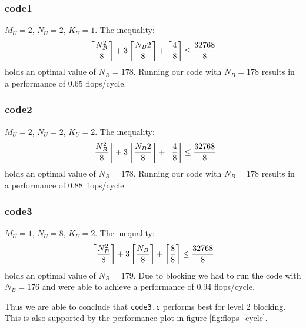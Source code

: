 \documentclass[portrait,a4paper]{article}
\begin{document}
\subsubsection{code1}
$M_U=2$, $N_U=2$, $K_U=1$. The inequality:
\begin{align*}
    \left\lceil {N_B^2 \over 8} \right\rceil + 3\left\lceil {N_B 2 \over 8} \right\rceil
    + \left\lceil {4 \over 8} \right\rceil \leq {32768 \over 8}
\end{align*}
holds an optimal value of $N_B=178$.  Running our code with $N_B=178$ results in a performance of $0.65$ flops/cycle.
\subsubsection{code2}
$M_U=2$, $N_U=2$, $K_U=2$. The inequality:
\begin{align*}
    \left\lceil {N_B^2 \over 8} \right\rceil + 3\left\lceil {N_B 2 \over 8} \right\rceil
    + \left\lceil {4\over 8} \right\rceil \leq {32768 \over 8}
\end{align*}
holds an optimal value of $N_B=178$. Running our code with $N_B=178$ results in a performance of $0.88$ flops/cycle.

\subsubsection{code3}
$M_U=1$, $N_U=8$, $K_U=2$. The inequality:
\begin{align*}
    \left\lceil {N_B^2 \over 8} \right\rceil + 3\left\lceil {N_B \over 8} \right\rceil
    + \left\lceil {8 \over 8} \right\rceil \leq {32768 \over 8}
\end{align*}
holds an optimal value of $N_B=179$. Due to blocking we had to run the code with $N_B=176$ and were able to achieve a performance of $0.94$ flops/cycle.

Thus we are able to conclude that \lstinline{code3.c} performs best for level 2 blocking. This is also supported by the performance plot in figure \ref{fig:flops_cycle}.
\end{document}
